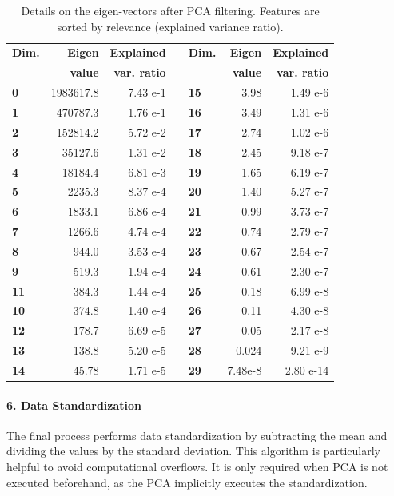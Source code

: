 \documentclass[fleqn,9 pt]{SelfArx} %
\begin{document}
\begin{sloppypar}
\begin{table}
\begin{scriptsize}
\begin{center}
\begin{tabular}{ l r r c l r r }
\hline
\textbf{Dim.} & \textbf{Eigen} & \textbf{Explained} & \hspace{0.1cm} & \textbf{Dim.} & \textbf{Eigen} & \textbf{Explained} \\
    &  \textbf{value} & \textbf{var. ratio} & & & \textbf{value} & \textbf{var. ratio} \\
\hline
\textbf{0} & 1983617.8 & 7.43 e-1 & & \textbf{15} & 3.98 & 1.49 e-6\\
\textbf{1} & 470787.3 & 1.76 e-1  & & \textbf{16} & 3.49 & 1.31 e-6\\
\textbf{2} & 152814.2 & 5.72 e-2  & & \textbf{17} & 2.74 & 1.02 e-6\\
\textbf{3} & 35127.6 & 1.31 e-2   & & \textbf{18} & 2.45 & 9.18 e-7\\
\textbf{4} & 18184.4 & 6.81 e-3   & & \textbf{19} & 1.65 & 6.19 e-7\\
\textbf{5} & 2235.3 & 8.37 e-4    & & \textbf{20} & 1.40 & 5.27 e-7\\
\textbf{6} & 1833.1 & 6.86 e-4    & & \textbf{21} & 0.99 & 3.73 e-7\\
\textbf{7} & 1266.6 & 4.74 e-4    & & \textbf{22} & 0.74 & 2.79 e-7\\
\textbf{8} & 944.0 & 3.53 e-4     & & \textbf{23} & 0.67 & 2.54 e-7\\
\textbf{9} & 519.3 & 1.94 e-4     & & \textbf{24} & 0.61 & 2.30 e-7\\
\textbf{11} & 384.3 & 1.44 e-4    & & \textbf{25} & 0.18 & 6.99 e-8\\
\textbf{10} & 374.8 & 1.40 e-4    & & \textbf{26} & 0.11 & 4.30 e-8\\
\textbf{12} & 178.7 & 6.69 e-5    & & \textbf{27} & 0.05 & 2.17 e-8\\
\textbf{13} & 138.8 & 5.20 e-5    & & \textbf{28} & 0.024 & 9.21 e-9\\
\textbf{14} & 45.78 & 1.71 e-5    & & \textbf{29} & 7.48e-8 & 2.80 e-14\\
\hline
\end{tabular}
\label{table-pca}
\end{center}
\end{scriptsize}
\caption{\small Details on the eigen-vectors after PCA filtering. Features are sorted by relevance (explained variance ratio).}
\label{table-pca}
\end{table}

\paragraph{6. Data Standardization} The final process performs data standardization by subtracting the mean and dividing the values by the standard deviation. This algorithm is particularly helpful to avoid computational overflows. It is only required when PCA is not executed beforehand, as the PCA implicitly executes the standardization.


\end{sloppypar}
\end{document}
